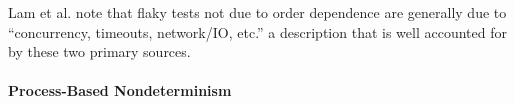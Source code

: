 Lam et al. \cite{idflakies} note that flaky tests not due to order
dependence are generally due to ``concurrency, timeouts,
network/IO, etc.'' a description that is well accounted for by these two
primary sources.

\paragraph{Process-Based Nondeterminism}

